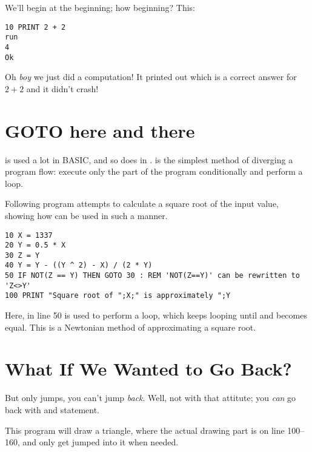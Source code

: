 \quad
{}

We'll begin at the beginning; how beginning? This:

\begin{lstlisting}
10 PRINT 2 + 2
run
4
Ok
\end{lstlisting}

Oh \emph{boy} we just did a computation! It printed out  which is a correct answer for $2+2$ and it didn't crash!

\section[GOTO]{GOTO here and there}

 is used a lot in BASIC, and so does in \tbas.  is the simplest method of diverging a program flow: execute only the part of the program conditionally and perform a loop.

Following program attempts to calculate a square root of the input value,  showing how  can be used in such a manner.

\begin{lstlisting}
10 X = 1337
20 Y = 0.5 * X
30 Z = Y
40 Y = Y - ((Y ^ 2) - X) / (2 * Y)
50 IF NOT(Z == Y) THEN GOTO 30 : REM 'NOT(Z==Y)' can be rewritten to 'Z<>Y' 
100 PRINT "Square root of ";X;" is approximately ";Y
\end{lstlisting}

Here,  in line 50 is used to perform a loop, which keeps looping until  and  becomes equal. This is a Newtonian method of approximating a square root. 

\section[Subroutine with GOSUB]{What If We Wanted to Go Back?}

But  only jumps, you can't jump \emph{back}. Well, not with that attitute; you \emph{can} go back with  and  statement.

This program will draw a triangle, where the actual drawing part is on line 100--160, and only get jumped into it when needed.

